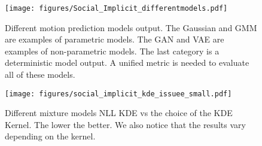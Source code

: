 \documentclass[runningheads]{llncs}
\begin{document}
\begin{figure}[!tbp]
  \centering
  \begin{minipage}[b]{0.49\textwidth}
    \texttt{[image: figures/Social\_Implicit\_differentmodels.pdf]}
   \caption{Different motion prediction models output. The Gaussian and GMM are examples of parametric models. The GAN and VAE are examples of non-parametric models. The last category is a deterministic model output. A unified metric is needed to evaluate all of these models.}
\label{gr:social_implicit_different_modes}
  \end{minipage}
  \hfill
  \begin{minipage}[b]{0.49\textwidth}
    \texttt{[image: figures/social\_implicit\_kde\_issuee\_small.pdf]}
       \caption{Different mixture models NLL KDE vs the choice of the KDE Kernel. The lower the better. We also notice that the results vary depending on the kernel.}
    \label{gr:social_implicit_kde_issue}
  \end{minipage}
\end{figure}
\end{document}
